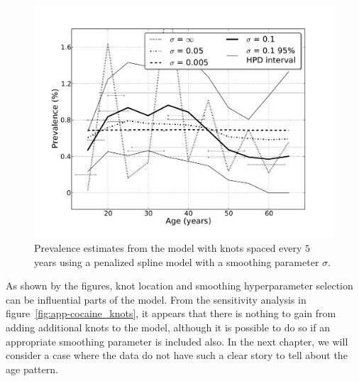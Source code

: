     \begin{figure}[h]
        \begin{center}
            \includegraphics[width=\textwidth]{applications/cocaine_dependence-smoothing.pdf}
            \caption[Prevalence estimates of cocaine dependence using a 
              smoothing parameter.]{Prevalence estimates from the model 
              with knots spaced every $5$ years
              using a penalized spline model with a smoothing
              parameter $\sigma$. }
        \label{fig:app-cocaine_smoothing}
        \end{center}
    \end{figure}

As shown by the figures, knot location and smoothing
hyperparameter selection can be influential parts of the model.
From the sensitivity analysis in figure~\ref{fig:app-cocaine_knots},
it appears that there is nothing to gain from adding additional
knots to the model, although it is possible to do so if an appropriate
smoothing parameter is included also.  In the next chapter, we will
consider a case where the data do not have such a clear story to
tell about the age pattern.

